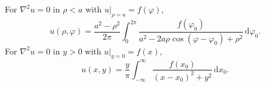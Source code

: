 \begin{example}
For $\nabla^2 u=0$ in $\rho<a$ with $u|_{\rho=a}=f(\varphi)$,
\begin{equation}
u(\rho,\varphi)
=\frac{a^2-\rho^2}{2\pi}\int_0^{2\pi}
\frac{f(\varphi_0)}{a^2-2a\rho\cos(\varphi-\varphi_0)+\rho^2}\,\mathrm{d}\varphi_0.
\end{equation}
For $\nabla^2 u=0$ in $y>0$ with $u|_{y=0}=f(x)$,
\begin{equation}
u(x,y)
=\frac{y}{\pi}\int_{-\infty}^{\infty}
\frac{f(x_0)}{(x-x_0)^2+y^2}\,\mathrm{d}x_0.
\end{equation}
\end{example}
